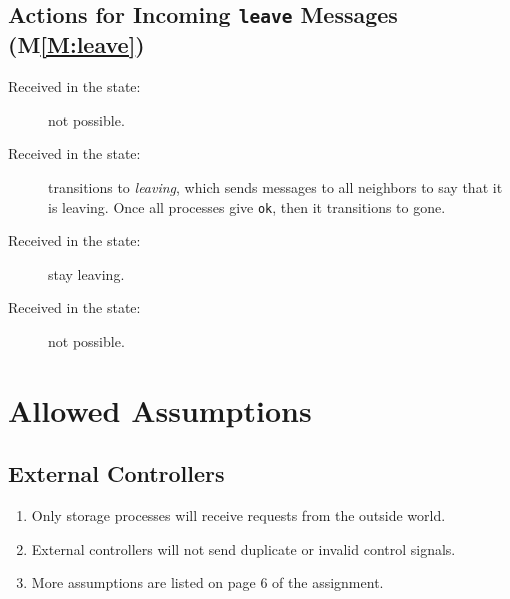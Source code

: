 \documentclass[11pt]{article}
\begin{document}
\subsection{Actions for Incoming \texttt{leave} Messages (M\ref{M:leave})}
\begin{description}
\item[Received in the \joining state:] not possible.
\item[Received in the \available state:] transitions to \emph{leaving}, which sends messages to all neighbors to say that it is leaving. Once all processes give \texttt{ok}, then it transitions to gone.
\item[Received in the \leaving state:] stay leaving.
\item[Received in the \gone state:] not possible.
\end{description}


%
%

\section{Allowed Assumptions}

\subsection{External Controllers}
\begin{enumerate}[\text{A}1]
\item \label{A:finite_time_red} Only storage processes will receive requests from the outside world.

\item \label{A:no_invalid_signals} External controllers will not send duplicate or invalid control signals.

\item More assumptions are listed on page 6 of the assignment.
\end{enumerate}
\end{document}

